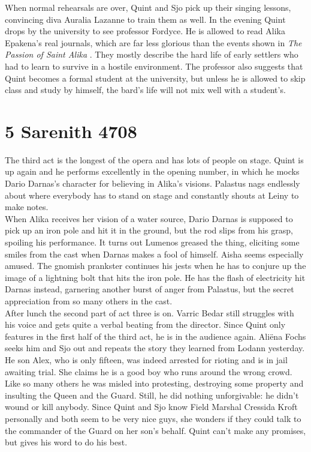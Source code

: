 When normal rehearsals are over, Quint and Sjo pick up their singing lessons, convincing diva Auralia Lazanne to train them as well. In the evening Quint drops by the university to see professor Fordyce. He is allowed to read Alika Epakena's real journals, which are far less glorious than the events shown in {\itshape The Passion of Saint Alika} . They mostly describe the hard life of early settlers who had to learn to survive in a hostile environment. The professor also suggests that Quint becomes a formal student at the university, but unless he is allowed to skip class and study by himself, the bard's life will not mix well with a student's. \section{5 Sarenith 4708}

The third act is the longest of the opera and has lots of people on stage. Quint is up again and he performs excellently in the opening number, in which he mocks Dario Darnas's character for believing in Alika's visions. Palastus nags endlessly about where everybody has to stand on stage and constantly shouts at Leiny to make notes.\\

When Alika receives her vision of a water source, Dario Darnas is supposed to pick up an iron pole and hit it in the ground, but the rod slips from his grasp, spoiling his performance. It turns out Lumenos greased the thing, eliciting some smiles from the cast when Darnas makes a fool of himself. Aisha seems especially amused. The gnomish prankster continues his jests when he has to conjure up the image of a lightning bolt that hits the iron pole. He has the flash of electricity hit Darnas instead, garnering another burst of anger from Palastus, but the secret appreciation from so many others in the cast.\\

After lunch the second part of act three is on. Varric Bedar still struggles with his voice and gets quite a verbal beating from the director. Since Quint only features in the first half of the third act, he is in the audience again. Ali\"ena Fochs seeks him and Sjo out and repeats the story they learned from Lodann yesterday. He son Alex, who is only fifteen, was indeed arrested for rioting and is in jail awaiting trial. She claims he is a good boy who runs around the wrong crowd. Like so many others he was misled into protesting, destroying some property and insulting the Queen and the Guard. Still, he did nothing unforgivable: he didn't wound or kill anybody. Since Quint and Sjo know Field Marshal Cressida Kroft personally and both seem to be very nice guys, she wonders if they could talk to the commander of the Guard on her son's behalf. Quint can't make any promises, but gives his word to do his best.\\

